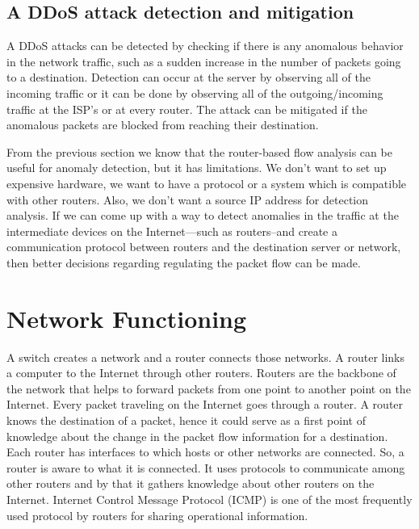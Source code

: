 \documentclass[12pt,oneside,a4paper]{article}
\begin{document}
\subsection{A DDoS attack detection and mitigation}

A DDoS attacks can be detected by checking if there is any anomalous behavior in the network traffic, such as a sudden increase in the number of packets going to a destination. Detection can occur at the server by observing all of the incoming traffic or it can be done by observing all of the outgoing/incoming traffic at the ISP's or at every router. The attack can be mitigated if the anomalous packets are blocked from reaching their destination.

From the previous section we know that the router-based flow analysis can be useful for anomaly detection, but it has limitations. We don't want to set up expensive hardware, we want to have a protocol or a system which is compatible with other routers. Also, we don't want a source IP address for detection analysis. If we can come up with a way to detect anomalies in the traffic at the intermediate devices on the Internet---such as routers--and create a communication protocol between routers and the destination server or network, then better decisions regarding regulating the packet flow can be made.

\pagebreak
\section{Network Functioning}

A switch creates a network and a router connects those networks. A router links a computer to the Internet through other routers. Routers are the backbone of the network that helps to forward packets from one point to another point on the Internet. Every packet traveling on the Internet goes through a router\cite{router-switch}. A router knows the destination of a packet, hence it could serve as a first point of knowledge about the change in the packet flow information for a destination. Each router has interfaces to which hosts or other networks are connected. So, a router is aware to what it is connected. It uses protocols to communicate among other routers and by that it gathers knowledge about other routers on the Internet.  Internet Control Message Protocol (ICMP)\cite{icmp} is one of the most frequently used protocol by routers for sharing operational information.\par
\end{document}
